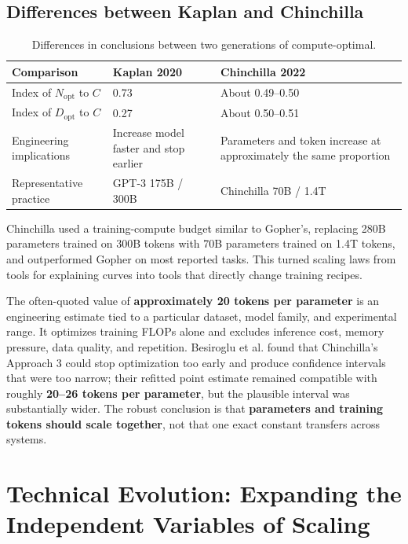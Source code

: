 \documentclass[UTF8,10pt,a4paper,fontset=none]{ctexart}
\newcommand{\term}[1]{\textbf{#1}}
\begin{document}
\subsection{Differences between Kaplan and Chinchilla}

\begin{table}[htbp]
\centering
\caption{Differences in conclusions between two generations of compute-optimal.}
\label{en:tab:kaplan-chinchilla}
\begin{tabularx}{\textwidth}{Y C{3.2cm} C{3.2cm}}
\toprule
Comparison & Kaplan 2020 & Chinchilla 2022 \\
\midrule
Index of $N_{\mathrm{opt}}$ to $C$ & 0.73 & About 0.49--0.50 \\
Index of $D_{\mathrm{opt}}$ to $C$ & 0.27 & About 0.50--0.51 \\
Engineering implications & Increase model faster and stop earlier & Parameters and token increase at approximately the same proportion \\
Representative practice & GPT-3 175B / 300B & Chinchilla 70B / 1.4T \\
\bottomrule
\end{tabularx}
\end{table}

Chinchilla used a training-compute budget similar to Gopher's, replacing 280B parameters trained on 300B tokens with 70B parameters trained on 1.4T tokens, and outperformed Gopher on most reported tasks\cite{en:rae2021,en:hoffmann2022}. This turned scaling laws from tools for explaining curves into tools that directly change training recipes.

The often-quoted value of \textbf{approximately 20 tokens per parameter} is an engineering estimate tied to a particular dataset, model family, and experimental range. It optimizes training FLOPs alone and excludes inference cost, memory pressure, data quality, and repetition. Besiroglu et al. found that Chinchilla's Approach 3 could stop optimization too early and produce confidence intervals that were too narrow; their refitted point estimate remained compatible with roughly \textbf{20--26 tokens per parameter}, but the plausible interval was substantially wider\cite{en:besiroglu2024}. The robust conclusion is that \term{parameters and training tokens should scale together}, not that one exact constant transfers across systems.

\section{Technical Evolution: Expanding the Independent Variables of Scaling}
\end{document}
